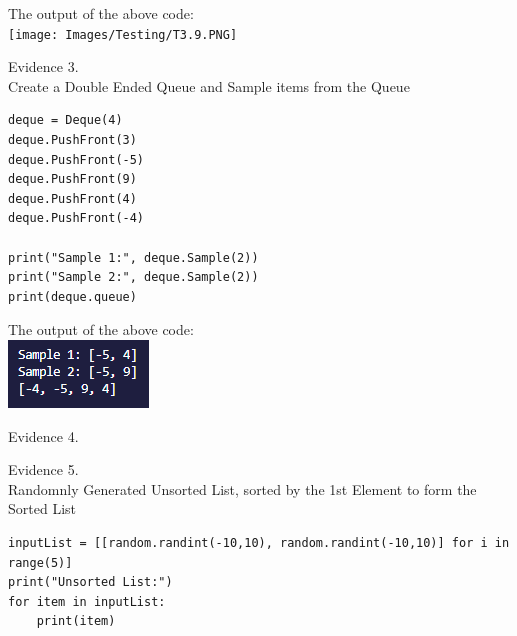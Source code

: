 \begin{flushleft}
\begin{center}
        The output of the above code: \\
        \texttt{[image: Images/Testing/T3.9.PNG]}
        \vspace{1cm}

        {\large Evidence 3.\rn } \\ 
        \vspace{0.3cm}
        Create a Double Ended Queue and Sample items from the Queue \\

        \begin{verbatim}
deque = Deque(4)
deque.PushFront(3)
deque.PushFront(-5)
deque.PushFront(9)
deque.PushFront(4)
deque.PushFront(-4)

print("Sample 1:", deque.Sample(2))
print("Sample 2:", deque.Sample(2))
print(deque.queue)
        \end{verbatim}

        The output of the above code: \\
        \includegraphics{Images/Testing/T3.10.1.PNG}
        \vspace{1cm}
    \end{center}

    \setcounter{magicrownumbers}{0}
    \begin{center}
        {\large Evidence 4.\rn } \\ 
        \vspace{0.3cm}

    \end{center}

    \setcounter{magicrownumbers}{0}
    \begin{center}
        {\large Evidence 5.\rn } \\ 
        \vspace{0.3cm}
        Randomnly Generated Unsorted List, sorted by the 1st Element to form the Sorted List \\

        \begin{verbatim}
inputList = [[random.randint(-10,10), random.randint(-10,10)] for i in range(5)]
print("Unsorted List:")
for item in inputList:
    print(item)


\end{verbatim}
\end{center}
\end{flushleft}
